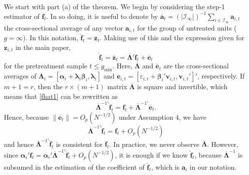 \documentclass[12pt,fleqn]{article}
\def\*#1{\mathbf{#1}}
\def\+#1{\boldsymbol{#1}}
\begin{document}
We start with part (a) of the theorem. We begin by considering the step-1 estimator of $\*f_t$. In so doing, it is useful to denote by $\overline{\*a}_t = (|\mathcal{I}_{\infty}|)^{-1}\sum_{i \in \mathcal{I}_{\infty}} \*a_{i,t}$ the cross-sectional average of any vector $\*a_{i,t}$ for the group of untreated units ($g= \infty$). In this notation, $\widehat{\*{f}}_t = \overline {\*z}_t$. Making use of this and the expression given for $\*z_{i,t}$ in the main paper,
\begin{equation}\label{fhat1}
\widehat{\*{f}}_t = \overline {\*{z}}_t = \overline{\+\Lambda}'\*{f}_t + \overline {\*e}_{t}
\end{equation}
for the pretreatment sample $t \leq g_{\min}$. Here, $\overline{\+\Lambda}$ and $\overline {\*e}_{t}$ are the cross-sectional averages of $\+\Lambda_i = [\+\alpha_i +\+\lambda_i\+\beta_i, \+\lambda_i]$ and $\*e_{i,t} = [\varepsilon_{i,t} + \+\beta_i'\*v_{i,t}, \*v_{i,t}']'$, respectively. If $m+1=r$, then the $r\times (m+1)$ matrix $\overline{\+\Lambda}$ is square and invertible, which means that \eqref{fhat1} can be rewritten as
\begin{equation}\label{redefined}
    \overline{\+\Lambda}^{-1\prime}\widehat{\*{f}}_t=\*{f}_t+\overline{\+\Lambda}^{-1\prime}\overline{\*e}_t .
\end{equation}
Hence, because $\|\overline{\*e}_t\|=O_p(N^{-1/2})$ under Assumption 4, we have
\begin{equation}\label{redefined2}
\overline{\+\Lambda}^{-1\prime}\widehat{\*{f}}_t = \*{f}_t + O_p(N^{-1/2})
\end{equation}
and hence $\overline{\+\Lambda}^{-1\prime} \widehat{\*{f}}_t$ is consistent for $\*{f}_t$. In practice, we never observe $\overline{\+\Lambda}$. However, since $\+{\alpha}_i'\*{f}_t = \+{\alpha}_i' \overline{\+\Lambda}^{-1\prime}\widehat{\*{f}}_t + O_p(N^{-1/2})$, it is enough if we know $\widehat{\*{f}}_t$, because $\overline{\+\Lambda}^{-1}$ is subsumed in the estimation of the coefficient of $\widehat{\*{f}}_t$, which is $\*a_i$ in our notation.
\end{document}
